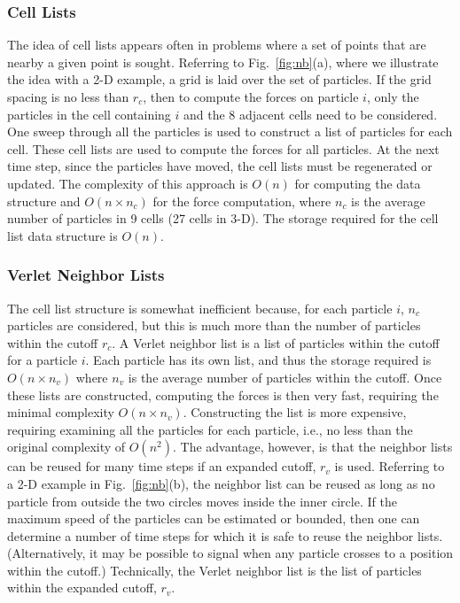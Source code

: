\subsubsection*{Cell Lists}  
The idea of cell lists appears often in problems where a
set of points that are nearby a given point is sought.  Referring to
Fig.~\ref{fig:nb}(a), where we illustrate the idea with a 2-D example, a grid is laid
over the set of particles.  If the grid spacing is no less than $r_c$,
then to compute the forces on particle $i$, only the particles in the
cell containing $i$ and the 8 adjacent cells need to be considered.
One sweep through all the particles is used to construct a list of
particles for each cell.  These cell lists are used to compute the forces
for all particles.  At the next time step, since the particles have moved,
the cell lists must be regenerated or updated.  The complexity of this
approach is $O(n)$ for computing the data structure and $O(n \times n_c)$
for the force computation, where $n_c$ is the average number of particles
in 9 cells (27 cells in 3-D).  The storage required for the cell list
data structure is $O(n)$.

\subsubsection*{Verlet Neighbor Lists}  
The cell list structure is somewhat
inefficient because, for each particle $i$, $n_c$ particles are
considered, but this is much more than the number of particles within
the cutoff $r_c$.  A Verlet neighbor list is a list of particles within
the cutoff for a particle $i$.  Each particle has its own list, and thus
the storage required is $O(n \times n_v)$ where $n_v$ is the average
number of particles within the cutoff.  Once these lists are constructed,
computing the forces is then very fast, requiring the minimal complexity
$O(n \times n_v)$.  Constructing the list is more expensive, requiring
examining all the particles for each particle, i.e., no less than the
original complexity of $O(n^2)$.  The advantage, however, is that the
neighbor lists can be reused for many time steps if an expanded cutoff,
$r_v$ is used.  Referring to a 2-D example in Fig.~\ref{fig:nb}(b),
the neighbor list can be reused as long as no particle from outside
the two circles moves inside the inner circle.  If the maximum speed
of the particles can be estimated or bounded, then one can determine a
number of time steps for which it is safe to reuse the neighbor lists.
(Alternatively, it may be possible to signal when any particle crosses
to a position within the cutoff.)  Technically, the Verlet neighbor list
is the list of particles within the expanded cutoff, $r_v$.

